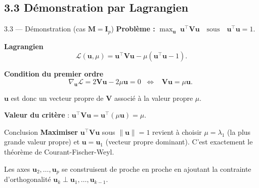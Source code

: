\subsection{3.3 Démonstration par Lagrangien}
\begin{frame}{3.3 — Démonstration (cas $\mathbf{M} = \mathbf{I}_p$)}
\textbf{Problème :} $\displaystyle \max_{\mathbf{u}}\; \mathbf{u}^\top \mathbf{V} \mathbf{u}
\quad\text{sous}\quad \mathbf{u}^\top \mathbf{u} = 1$.

\vspace{0.2cm}
\textbf{Lagrangien}
\[
\mathcal{L}(\mathbf{u}, \mu) = \mathbf{u}^\top \mathbf{V} \mathbf{u} - \mu (\mathbf{u}^\top \mathbf{u} - 1).
\]

\textbf{Condition du premier ordre}
\[
\nabla_{\mathbf{u}} \mathcal{L} = 2 \mathbf{V} \mathbf{u} - 2 \mu \mathbf{u} = 0
\;\;\Longleftrightarrow\;\;
\boxed{\;\mathbf{V}\mathbf{u} = \mu \mathbf{u}.\;}
\]

\vspace{0.1cm}
$\mathbf{u}$ est donc un vecteur propre de $\mathbf{V}$ associé à la valeur propre $\mu$.

\textbf{Valeur du critère} :
$\mathbf{u}^\top \mathbf{V} \mathbf{u} = \mathbf{u}^\top (\mu \mathbf{u}) = \mu$.
\medskip

\begin{block}{Conclusion}
\textbf{Maximiser} $\mathbf{u}^\top \mathbf{V} \mathbf{u}$ sous $\|\mathbf{u}\|=1$ revient à
choisir $\mu = \lambda_1$ (la plus grande valeur propre) et $\mathbf{u} = \mathbf{u}_1$
(vecteur propre dominant). C'est exactement le théorème de Courant-Fischer-Weyl.
\end{block}

\begin{rema}
Les axes $\mathbf{u}_2, \ldots, \mathbf{u}_p$ se construisent de proche en proche en
ajoutant la contrainte d'orthogonalité $\mathbf{u}_k \perp \mathbf{u}_1, \ldots, \mathbf{u}_{k-1}$.
\end{rema}
\end{frame}

